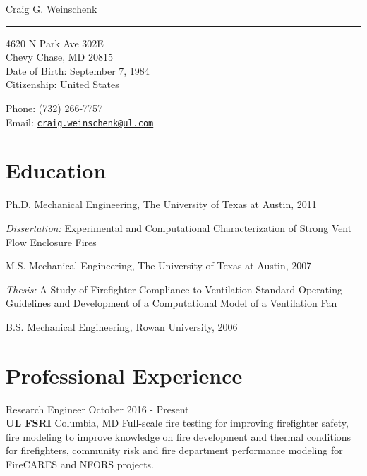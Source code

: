 \documentclass[10pt,letterpaper]{article}
\def\name{Craig G. Weinschenk}
\renewenvironment{itemize}{
  \begin{list}{}{
    \setlength{\leftmargin}{1.5em}
  }
}{
  \end{list}
}
\begin{document}
{\huge \name} \\
\noindent\rule{17cm}{0.4pt}


\vspace{0.25in}

\begin{minipage}[t]{0.5\textwidth}
  4620 N Park Ave 302E \\
  Chevy Chase, MD  20815\\
  Date of Birth: September 7, 1984 \\
  Citizenship: United States
\end{minipage}
\begin{minipage}[t]{0.5\textwidth}
  Phone: (732) 266-7757 \\
  Email: \href{mailto:craig.weinschenk@ul.com} {\tt craig.weinschenk@ul.com}\\

\end{minipage}

\section*{Education}

\begin{itemize}
  \item Ph.D. Mechanical Engineering, The University of Texas at Austin, 2011
    \begin{itemize}
      \item \textit{Dissertation:} Experimental and Computational Characterization of Strong Vent Flow Enclosure Fires
    \end{itemize}

  \item M.S. Mechanical Engineering, The University of Texas at Austin, 2007
    \begin{itemize}
      \item \textit{Thesis:} A Study of Firefighter Compliance to Ventilation Standard Operating Guidelines and Development of a Computational Model of a Ventilation Fan
    \end{itemize}

  \item B.S. Mechanical Engineering, Rowan University, 2006
\end{itemize}

\section*{Professional Experience}
Research Engineer \hfill October 2016 - Present \\
{\bf UL FSRI} \hfill Columbia, MD \vskip3pt
Full-scale fire testing for improving firefighter safety, fire modeling to improve knowledge on fire development and thermal conditions for firefighters, community risk and fire department performance modeling for FireCARES and NFORS projects. \\
\end{document}
